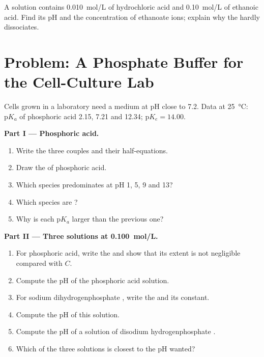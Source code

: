\begin{exercise}[$\star\star\star$]\label{exo:b1:predominant-reaction:12}
A solution contains \qty{0.010}{mol/L} of hydrochloric acid and
\qty{0.10}{mol/L} of ethanoic acid. Find its pH and the concentration of
ethanoate ions; explain why the  hardly dissociates.
\end{exercise}

\section{Problem: A Phosphate Buffer for the Cell-Culture Lab}

\begin{problem}
\label{pb:b1:predominant-reaction:1}
Cells grown in a laboratory need a medium at pH close to 7.2. Data at
\qty{25}{\celsius}: $\mathrm{p}K_a$ of phosphoric acid 2.15, 7.21 and
12.34; $\mathrm{p}K_e = 14.00$.

\medskip
\noindent\textbf{Part I --- Phosphoric acid.}
\begin{enumerate}
  \item Write the three couples and their half-equations.
  \item Draw the  of phosphoric acid.
  \item Which species predominates at pH 1, 5, 9 and 13?
  \item Which species are ?
  \item Why is each $\mathrm{p}K_a$ larger than the previous one?
\end{enumerate}

\medskip
\noindent\textbf{Part II --- Three solutions at \qty{0.100}{mol/L}.}
\begin{enumerate}[resume]
  \item For phosphoric acid, write the  and show that
        its extent is not negligible compared with $C$.
  \item Compute the pH of the phosphoric acid solution.
  \item For sodium dihydrogenphosphate , write the  and its constant.
  \item Compute the pH of this solution.
  \item Compute the pH of a solution of disodium hydrogenphosphate
        .
  \item Which of the three solutions is closest to the pH wanted?
\end{enumerate}


\end{problem}
